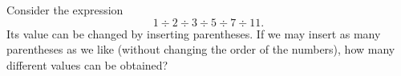 Consider the expression
\[
1\div2\div3\div5\div7\div11.
\]
Its value can be changed by inserting parentheses. If we may insert as many parentheses as we like (without changing the order of the numbers), how many different values can be obtained?

